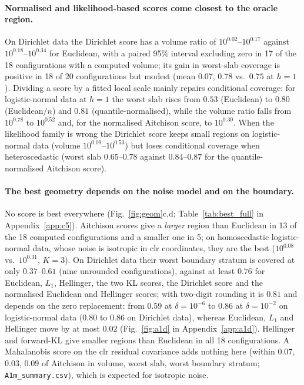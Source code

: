 \paragraph{Normalised and likelihood-based scores come closest to the oracle region.}
On Dirichlet data the Dirichlet score has a volume ratio of $10^{0.02}$--$10^{0.17}$ against $10^{0.18}$--$10^{0.34}$ for Euclidean, with a paired 95\% interval excluding zero in 17 of the 18 configurations with a computed volume; its gain in worst-slab coverage is positive in 18 of 20 configurations but modest (mean $0.07$, $0.78$ vs.\ $0.75$ at $h=1$).
Dividing a score by a fitted local scale mainly repairs conditional coverage: for logistic-normal data at $h=1$ the worst slab rises from $0.53$ (Euclidean) to $0.80$ (Euclidean$/n$) and $0.81$ (quantile-normalised), while the volume ratio falls from $10^{0.78}$ to $10^{0.52}$ and, for the normalised Aitchison score, to $10^{0.30}$.
When the likelihood family is wrong the Dirichlet score keeps small regions on logistic-normal data (volume $10^{0.09}$--$10^{0.53}$) but loses conditional coverage when heteroscedastic (worst slab $0.65$--$0.78$ against $0.84$--$0.87$ for the quantile-normalised Aitchison score).

\paragraph{The best geometry depends on the noise model and on the boundary.}
No score is best everywhere (Fig.~\ref{fig:geom}c,d; Table~\ref{tab:best_full} in Appendix~\ref{app:c5}).
Aitchison scores give a \emph{larger} region than Euclidean in 13 of the 18 computed configurations and a smaller one in 5; on homoscedastic logistic-normal data, whose noise is isotropic in clr coordinates, they are the best ($10^{0.08}$ vs.\ $10^{0.31}$, $K=3$).
On Dirichlet data their worst boundary stratum is covered at only $0.37$--$0.61$ (nine unrounded configurations), against at least $0.76$ for Euclidean, $L_1$, Hellinger, the two KL scores, the Dirichlet score and the normalised Euclidean and Hellinger scores; with two-digit rounding it is $0.81$ and depends on the zero replacement: from $0.59$ at $\delta=10^{-6}$ to $0.86$ at $\delta=10^{-2}$ on logistic-normal data ($0.80$ to $0.86$ on Dirichlet data), whereas Euclidean, $L_1$ and Hellinger move by at most $0.02$ (Fig.~\ref{fig:a1d} in Appendix~\ref{app:a1d}).
Hellinger and forward-KL give smaller regions than Euclidean in all 18 configurations.
A Mahalanobis score on the clr residual covariance adds nothing here (within $0.07$, $0.03$, $0.09$ of Aitchison in volume, worst slab, worst boundary stratum; \texttt{A1m\_summary.csv}), which is expected for isotropic noise.


